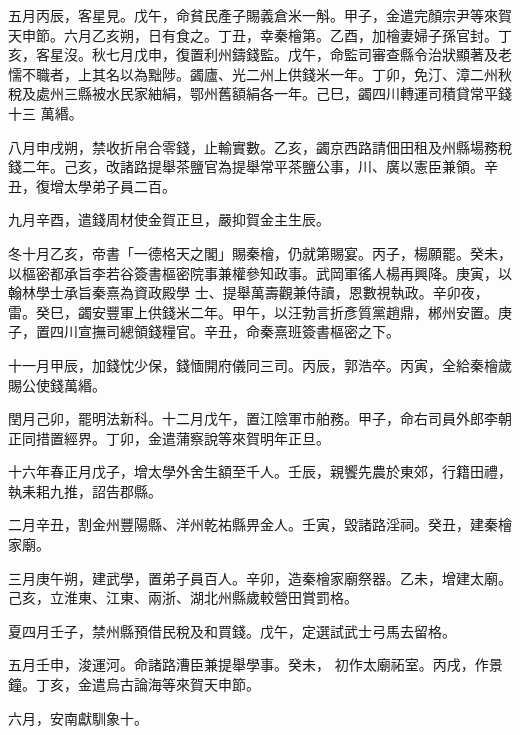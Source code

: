 \begin{pinyinscope}
 五月丙辰，客星見。戊午，命貧民產子賜義倉米一斛。甲子，金遣完顏宗尹等來賀天申節。六月乙亥朔，日有食之。丁丑，幸秦檜第。乙酉，加檜妻婦子孫官封。丁亥，客星沒。秋七月戊申，復置利州鑄錢監。戊午，命監司審查縣令治狀顯著及老懦不職者，上其名以為黜陟。蠲廬、光二州上供錢米一年。丁卯，免汀、漳二州秋稅及處州三縣被水民家紬絹，鄂州舊額絹各一年。己巳，蠲四川轉運司積貸常平錢十三
 萬緡。



 八月申戌朔，禁收折帛合零錢，止輸實數。乙亥，蠲京西路請佃田租及州縣場務稅錢二年。己亥，改諸路提舉茶鹽官為提舉常平茶鹽公事，川、廣以憲臣兼領。辛丑，復增太學弟子員二百。



 九月辛酉，遣錢周材使金賀正旦，嚴抑賀金主生辰。



 冬十月乙亥，帝書「一德格天之閣」賜秦檜，仍就第賜宴。丙子，楊願罷。癸未，以樞密都承旨李若谷簽書樞密院事兼權參知政事。武岡軍徭人楊再興降。庚寅，以翰林學士承旨秦熹為資政殿學
 士、提舉萬壽觀兼侍讀，恩數視執政。辛卯夜，雷。癸巳，蠲安豐軍上供錢米二年。甲午，以汪勃言折彥質黨趙鼎，郴州安置。庚子，置四川宣撫司總領錢糧官。辛丑，命秦熹班簽書樞密之下。



 十一月甲辰，加錢忱少保，錢愐開府儀同三司。丙辰，郭浩卒。丙寅，全給秦檜歲賜公使錢萬緡。



 閏月己卯，罷明法新科。十二月戊午，置江陰軍市舶務。甲子，命右司員外郎李朝正同措置經界。丁卯，金遣蒲察說等來賀明年正旦。



 十六年春正月戊子，增太學外舍生額至千人。壬辰，親饗先農於東郊，行籍田禮，執耒耜九推，詔告郡縣。



 二月辛丑，割金州豐陽縣、洋州乾祐縣畀金人。壬寅，毀諸路淫祠。癸丑，建秦檜家廟。



 三月庚午朔，建武學，置弟子員百人。辛卯，造秦檜家廟祭器。乙未，增建太廟。己亥，立淮東、江東、兩浙、湖北州縣歲較營田賞罰格。



 夏四月壬子，禁州縣預借民稅及和買錢。戊午，定選試武士弓馬去留格。



 五月壬申，浚運河。命諸路漕臣兼提舉學事。癸未，
 初作太廟祏室。丙戌，作景鐘。丁亥，金遣烏古論海等來賀天申節。



 六月，安南獻馴象十。




\end{pinyinscope}
